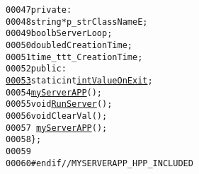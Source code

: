 \begin{footnotesize}
\begin{alltt}
00047     \textcolor{keyword}{private}:
00048         \textcolor{keywordtype}{string} *p\_strClassNameE;
00049         \textcolor{keywordtype}{bool} bServerLoop;
00050         \textcolor{keywordtype}{double} dCreationTime;
00051         time\_t tt\_CreationTime;
00052     \textcolor{keyword}{public}:
\hypertarget{myServerAPP_8hpp_source_l00053}{}\hyperlink{classmyServerAPP_ae183443a38d0b8e96762083c42385db3}{00053}         \textcolor{keyword}{static} \textcolor{keywordtype}{int} \hyperlink{classmyServerAPP_ae183443a38d0b8e96762083c42385db3}{intValueOnExit};
00054         \hyperlink{classmyServerAPP}{myServerAPP}();
00055         \textcolor{keywordtype}{void} \hyperlink{classmyServerAPP_a1683e57c122e19f851e350fc3095caed}{RunServer}();
00056         \textcolor{keywordtype}{void} ClearVal();
00057         ~\hyperlink{classmyServerAPP}{myServerAPP}();
00058 \};
00059 
00060 \textcolor{preprocessor}{#endif // MYSERVERAPP\_HPP\_INCLUDED}
\end{alltt}\end{footnotesize}
